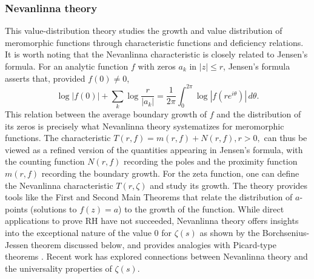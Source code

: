 \documentclass{article}
\begin{document}
   \subsubsection{Nevanlinna theory} This value-distribution theory \cite{Nevanlinna1, NevanlinnaCollected, Laine} studies the growth and value distribution of meromorphic functions through characteristic functions and deficiency relations. It is worth noting that the Nevanlinna characteristic is closely related to Jensen’s formula. 
For an analytic function $f$ with zeros $a_k$ in $|z|\leq r$, Jensen’s formula asserts that, provided $f(0)\neq 0$,
\[
\log|f(0)| + \sum_{k} \log \frac{r}{|a_k|}
   = \frac{1}{2\pi} \int_0^{2\pi} \log |f(re^{i\theta})|\,d\theta.
\]
This relation between the average boundary growth of $f$ and the distribution of its zeros 
is precisely what Nevanlinna theory systematizes for meromorphic functions. 
The characteristic $T(r,f) = m(r,f) + N(r,f),  r > 0,$ can thus be viewed as a refined version of the quantities 
appearing in Jensen’s formula, with the counting function $N(r,f)$ recording the poles 
and the proximity function $m(r,f)$ recording the boundary growth. For the zeta function, one can define the Nevanlinna characteristic $T(r,\zeta)$ and study its growth. The theory provides tools like the First and Second Main Theorems that relate the distribution of $a$-points (solutions to $f(z) = a$) to the growth of the function. While direct applications to prove RH have not succeeded, Nevanlinna theory offers insights into the exceptional nature of the value $0$ for $\zeta(s)$ as shown by the Borchsenius-Jessen theorem discussed below, and provides analogies with Picard-type theorems \cite{GoldbergOstrovskii}. Recent work has explored connections between Nevanlinna theory and the universality properties of $\zeta(s)$.
   
\end{document}
